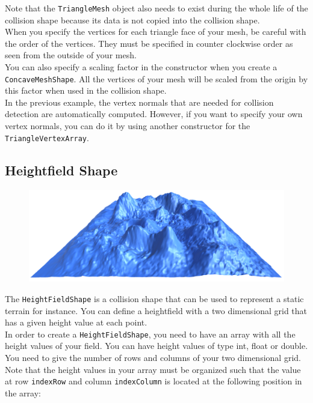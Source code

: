\documentclass[a4paper,12pt]{article}
\begin{document}
  \vspace{0.6cm}

  Note that the \texttt{TriangleMesh} object also needs to exist during the whole life of the collision shape because its
  data is not copied into the collision shape. \\

  When you specify the vertices for each triangle face of your mesh, be careful with the order of the vertices. They must be specified in counter clockwise order
  as seen from the outside of your mesh. \\

  You can also specify a scaling factor in the constructor when you create a \texttt{Concave\allowbreak MeshShape}. All the vertices of your mesh will be scaled from the origin by this factor
  when used in the collision shape. \\

  In the previous example, the vertex normals that are needed for collision detection are automatically computed. However, if you want to specify your own
  vertex normals, you can do it by using another constructor for the \texttt{TriangleVertexArray}. \\

  \subsection{Heightfield Shape}

  \begin{figure}[h]
      \centering
      \includegraphics{heightfieldshape.png}
      \label{fig:heightfieldshape}
  \end{figure}

  The \texttt{HeightFieldShape} is a collision shape that can be used to represent a static terrain for instance. You can
  define a heightfield with a two dimensional grid that has a given height value at each point. \\

  In order to create a \texttt{HeightFieldShape}, you need to have an array with all the height values of your field.
  You can have height values of type int, float or double. You need to give the number of rows and columns of your two
  dimensional grid. Note that the height values in your array must be organized such that the value at row
  \texttt{indexRow} and column \texttt{indexColumn} is located at the following position in the array: \\
\end{document}
